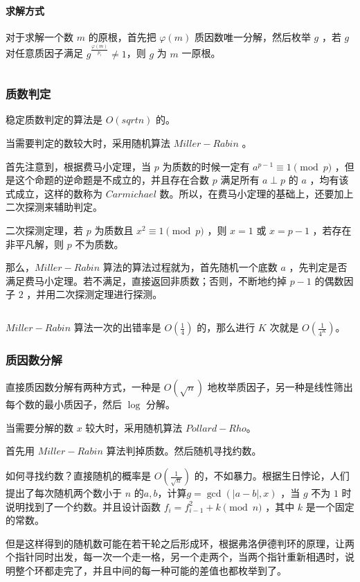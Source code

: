 \documentclass[UTF-8]{ctexart}
\newcommand{\cpp}[1]{\inputminted[bgcolor=bg,breaklines,breakanywhere=true]{c++}{#1}}
\begin{document}
			\paragraph{求解方式} 对于求解一个数 $m$ 的原根，首先把 $\varphi(m)$ 质因数唯一分解，然后枚举 $g$ ，若 $g$ 对任意质因子满足 $g^{\frac{\varphi(m)}{p_i}} \ne 1$，则 $g$ 为 $m$ 一原根。
			
			\cpp{code//Math//priroot.cpp}
			\subsubsection{质数判定}
			稳定质数判定的算法是 $O(sqrt{n})$ 的。

			当需要判定的数较大时，采用随机算法 $Miller-Rabin$ 。

			首先注意到，根据费马小定理，当 $p$ 为质数的时候一定有 $a^{p-1} \equiv 1 \pmod{p}$ ，但是这个命题的逆命题是不成立的，并且存在合数 $p$ 满足所有 $a \perp p$ 的 $a$ ，均有该式成立，这样的数称为 $Carmichael$ 数。所以，在费马小定理的基础上，还要加上二次探测来辅助判定。

			二次探测定理，若 $p$ 为质数且 $x^2 \equiv 1 \pmod{p}$ ，则 $x=1$ 或 $x=p-1$ ，若存在非平凡解，则 $p$ 不为质数。

			那么，$Miller-Rabin$ 算法的算法过程就为，首先随机一个底数 $a$ ，先判定是否满足费马小定理。若不满足，直接返回非质数；否则，不断地约掉 $p-1$ 的偶数因子 $2$ ，并用二次探测定理进行探测。
			
			\cpp{code//Math//millerrabin.cpp}

			$Miller-Rabin$ 算法一次的出错率是 $O(\frac{1}{4})$ 的，那么进行 $K$ 次就是 $O(\frac{1}{4^K})$。
			\subsubsection{质因数分解}
			直接质因数分解有两种方式，一种是 $O(\sqrt{n})$ 地枚举质因子，另一种是线性筛出每个数的最小质因子，然后 $\log$ 分解。

			当需要分解的数 $x$ 较大时，采用随机算法 $Pollard-Rho$。

			首先用 $Miller-Rabin$ 算法判掉质数。然后随机寻找约数。

			如何寻找约数？直接随机的概率是 $O(\frac{1}{\sqrt{n}})$ 的，不如暴力。根据生日悖论，人们提出了每次随机两个数小于 $n$ 的$a,b$，计算$g=\gcd(|a-b|,x)$ ，当 $g$ 不为 $1$ 时说明找到了一个约数。并且设计函数 $f_i=f_{i-1}^2+k \pmod{n}$ ，其中 $k$ 是一个固定的常数。

			但是这样得到的随机数可能在若干轮之后形成环，根据弗洛伊德判环的原理，让两个指针同时出发，每一次一个走一格，另一个走两个，当两个指针重新相遇时，说明整个环都走完了，并且中间的每一种可能的差值也都枚举到了。
			
\end{document}
